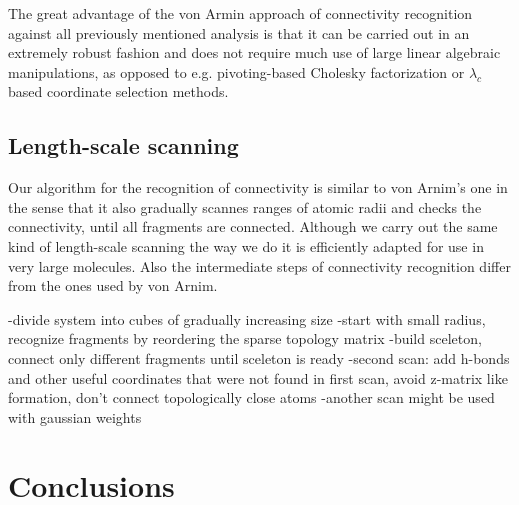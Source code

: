 \documentclass[prl,aps,preprint,superbib,12pt]{revtex4}
\begin{document}
The great advantage of the von Armin approach of
connectivity recognition against all previously
mentioned analysis is that it can be carried out in an extremely robust
fashion and does not require much use of large linear algebraic
manipulations, as opposed to e.g. pivoting-based Cholesky 
factorization or $\lambda_{c}$ based coordinate selection methods.

\subsection{Length-scale scanning}
Our algorithm for the recognition of connectivity is similar
to von Arnim's one in the sense that it also gradually scannes 
ranges of atomic radii and checks the connectivity, until all fragments
are connected. Although we carry out the same kind of length-scale
scanning the way we do it is efficiently adapted for use in very large
molecules. Also the intermediate steps of connectivity recognition
differ from the ones used by von Arnim.  

-divide system into cubes of gradually increasing size
-start with small radius, recognize fragments by reordering
the sparse topology matrix
-build sceleton, connect only different fragments until sceleton is ready
-second scan: add h-bonds and other useful coordinates that were not found in first scan, avoid z-matrix like formation, don't connect topologically close atoms
-another scan might be used with gaussian weights

\section{Conclusions} \label{Conclusions}


\end{document}
